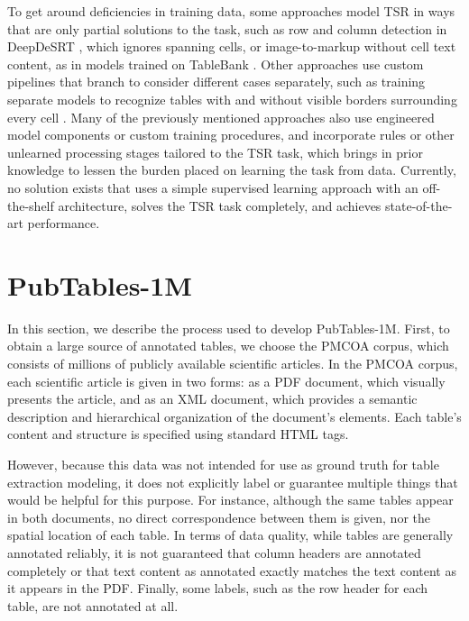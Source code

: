 \documentclass[10pt,twocolumn,letterpaper]{article}
\begin{document}
To get around deficiencies in training data, some approaches model TSR in ways that are only partial solutions to the task, such as row and column detection in DeepDeSRT \cite{schreiber2017deepdesrt}, which ignores spanning cells, or image-to-markup without cell text content, as in models trained on TableBank \cite{li2020tablebank}.
Other approaches use custom pipelines that branch to consider different cases separately, such as training separate models to recognize tables with and without visible borders surrounding every cell \cite{prasad2020cascadetabnet, zheng2021global}.
Many of the previously mentioned approaches also use engineered model components or custom training procedures, and incorporate rules or other unlearned processing stages tailored to the TSR task, which brings in prior knowledge to lessen the burden placed on learning the task from data.
Currently, no solution exists that uses a simple supervised learning approach with an off-the-shelf architecture, solves the TSR task completely, and achieves state-of-the-art performance.

\section{PubTables-1M}\label{sec:dataset}

In this section, we describe the process used to develop PubTables-1M.
First, to obtain a large source of annotated tables, we choose the PMCOA corpus, which consists of millions of publicly available scientific articles.
In the PMCOA corpus, each scientific article is given in two forms: as a PDF document, which visually presents the article, and as an XML document, which provides a semantic description and hierarchical organization of the document's elements.
Each table's content and structure is specified using standard HTML tags.

However, because this data was not intended for use as ground truth for table extraction modeling, it does not explicitly label or guarantee multiple things that would be helpful for this purpose.
For instance, although the same tables appear in both documents, no direct correspondence between them is given, nor the spatial location of each table.
In terms of data quality, while tables are generally annotated reliably, it is not guaranteed that column headers are annotated completely or that text content as annotated exactly matches the text content as it appears in the PDF.
Finally, some labels, such as the row header for each table, are not annotated at all.
\end{document}
